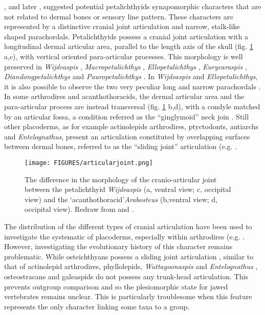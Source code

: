 \documentclass[11pt,letterpaper]{report}
\begin{document}
\cite{Zhu1991}, and later \cite{Zhu1996a}, suggested potential petalichthyids synapomorphic characters that are not related to dermal bones or sensory line pattern. These characters are represented by a distinctive cranial joint articulation and narrow, stalk-like shaped parachordals. Petalichthyids possess a cranial joint articulation with a longitudinal dermal articular area, parallel to the length axis of the skull (fig. \ref{articular} a,c), with vertical oriented para-articular processes. This morphology is well preserved in \textit{Wijdeaspis} \citep{Young1978}, \textit{Macropetalichthys} \citep{Stensi1969}, \textit{Ellopetalichthys} \citep{Ørvig1957}, \textit{Eurycaraspis} \citep{Liu1991}, \textit{Diandongpetalichthys} \citep{p1978devonian} and \textit{Pauropetalichthys} \citep{pan2015new}. In \textit{Wijdeaspis} and \textit{Ellopetalichthys}, it is also possible to observe the two very peculiar long and narrow parachordals \citep{Ørvig1957,Young1978}. In some arthrodires and acanthothoracids, the dermal articular area and the para-articular process are instead transversal (fig. \ref{articular} b,d), with a condyle matched by an articular fossa, a condition referred as the “ginglymoid” neck join \citep{Long1984,Forey1986a,Gardiner1990,Goujet1984b,dupret2004phylogenetic,Young2009,Olive2011}. Still other placoderms, as for example actinolepids arthrodires, ptyctodonts, antiarchs and \textit{Entelognathus}, present an articulation constituted by overlapping surfaces between dermal bones, referred to as the “sliding joint” articulation  (e.g. \citealt{Denison1978,Young1979,Goujet1984b,Long1984,Forey1986a,dupret2004phylogenetic}.

\begin{figure}[!h]
\centering
    \texttt{[image: FIGURES/articularjoint.png]}
\caption{\footnotesize{The difference in the morphology of the cranio-articular joint between the petalichthyid \textit{Wijdeaspis} (a, ventral view; c, occipital view) and the \lq{acanthothoracid}\rq \textit{Arabosteus} (b,ventral view; d, occipital view). Redraw from \citealt{Young1978} and \citealt{Olive2011}.}}
\label{articular}
\end{figure}

The distribution of the different types of cranial articulation have been used to investigate the systematic of placoderms, especially within arthrodires (e.g. \citealt{Denison1975,Miles1977,Young1979,Young1986,dupret2004phylogenetic,Dupret2007}. However, investigating the evolutionary history of this character remains problematic. While osteichthyans possess a sliding joint articulation \citep{Zhu2009}, similar to that of actinolepid arthrodires, phyllolepids, \textit{Wuttagoonaspis} and \textit{Entelognathus} \citep{Ritchie,Denison1978,Goujet1984a,zhu2013silurian}, osteostracans and galeaspids do not possess any trunk-head articulation. This prevents outgroup comparison and so the plesiomorphic state for jawed vertebrates remains unclear. This is particularly troublesome when this feature represents the only character linking some taxa to a group. 
\end{document}
